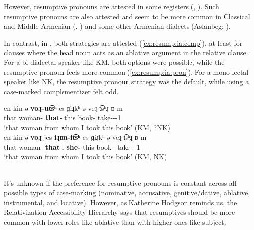 However, resumptive pronouns are attested in some   {\seaCEA} registers (\citealt[100]{Polinsky-1995-CrossLinguisticParellelsLanguageLoss}, \citealt[ex:5]{Hodgson-2020-FiniteRelativeClauseColloquialArmenianInverseAttraction}). Such resumptive pronouns are also attested and seem to be more common in Classical and Middle Armenian (\citealt{Hewitt-1978-ArmenianRelativeClause}, \citealt[\S3.3]{Hodgson-2020-FiniteRelativeClauseColloquialArmenianInverseAttraction}) and some other Armenian dialects (Aslanbeg: \citealt[53]{Vaux-2001-ArmenianDialectAslanberg}). 


In contrast, in {\iaIA}, both strategies are attested (\ref{ex:resump:ia:comp}), at least for clauses where the head noun acts as an ablative argument in the relative clause. For a bi-dialectal speaker like KM, both options were possible, while   the resumptive pronoun feels more common (\ref{ex:resump:ia:pron}). For a mono-lectal speaker like NK, the resumptive pronoun strategy was the default, while using a case-marked complementizer felt odd.  

\begin{exe}
	\ex {{\iaIA}}
	\begin{xlist}
		\ex  \gll  en kin-ǝ \textbf{voɻ-ut͡sʰ} es ɡiɻkʰ-ǝ veɻ-t͡sʰɻ-ɒ-m \\
		that woman-{} \textbf{that-{\abl}}  this book-{} take-{\caus}-{\pst}-1{\sg} \\
		\trans `that woman from whom I took this book'  \label{ex:resump:ia:comp} \hfill (KM, ?NK) \\
		\ex  \gll en kin-ǝ \textbf{voɻ} jes \textbf{iɻɒn-it͡sʰ} es ɡiɻkʰ-ǝ veɻ-t͡sʰɻ-ɒ-m \\
		that woman-{} \textbf{that} I \textbf{she-{\abl}} this book--{} take-{\caus}-{\pst}-1{\sg} \\
		\trans `that woman from whom I took this book' \label{ex:resump:ia:pron} \hfill (KM, NK) \\
		 \\
		
\end{xlist}\end{exe}

It's unknown if the preference for resumptive pronouns is constant across all possible types of case-marking (nominative, accusative, genitive/dative, ablative, instrumental, and locative). However, as Katherine Hodgson reminds us,   the Relativization Accessibility Hierarchy \citep{Keenan-1977-NounPhraseAccessibilityUniversalGrammar} says that resumptives should be more common with lower roles like ablative than with higher ones like subject. 

